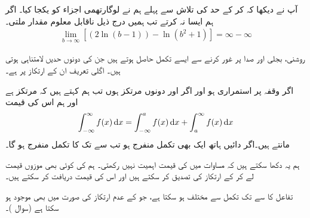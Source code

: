 آپ نے دیکھا کہ  کر کے حد کی تلاش سے پہلے ہم نے لوگارتھمی اجزاء کو یکجا کیا۔ اگر ہم ایسا نہ کرتے تب ہمیں درج ذیل ناقابل معلوم مقدار ملتی۔
\begin{align*}
\lim_{b\to \infty} [(2\ln(b-1))-\ln(b^2+1)]=\infty-\infty
\end{align*} 

روشنی، بجلی اور  صدا پر غور کرنے سے ایسے تکمل حاصل ہوتے ہیں جن کی  دونوں حدیں  لامتناہی ہوتی ہیں۔ اگلی تعریف ان کے ارتکاز پر ہے۔

اگر وقفہ  پر  استمراری ہو اور اگر  اور  دونوں مرتکز ہوں تب ہم کہتے ہیں کہ  مرتکز ہے اور  ہم اس کی قیمت 
\begin{align}\label{مساوات_طریقہ_لامتناہی_حدود_کا_تکمل}
\int_{-\infty}^{\infty}f(x)\dif x=\int_{-\infty}^af(x)\dif x+\int_a^{\infty}f(x)\dif x
\end{align}
مانتے ہیں۔اگر دائیں ہاتھ ایک بھی تکمل منفرج ہو تب  سے  تک  کا تکمل منفرج ہو گا۔

ہم یہ دکھا سکتے ہیں کہ مساوات  میں  کی قیمت اہمیت نہیں رکھتی۔ ہم  کی کوئی بھی موزوں قیمت لے کر   کے ارتکاز کی تصدیق کر سکتے ہیں اور اس کی قیمت  دریافت کر سکتے ہیں۔

تفاعل  کا  سے  تک تکمل  سے مختلف ہو سکتا ہے، جو  کے  عدم ارتکاز کی صورت میں بھی موجود ہو سکتا ہے (سوال )۔

